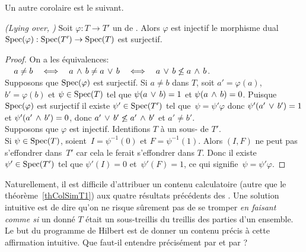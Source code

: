 Un autre corolaire est le suivant.
\begin{proposition}
\label{propRep2} \emph{(Lying over, \trdis)}
\Tcgi Soit $\varphi:T\rightarrow T'$ un \homo de \trdis. Alors $\varphi$
est injectif \ssi le morphisme dual ${\rm Spec}(\varphi):{\rm Spec}(T')\rightarrow {\rm Spec}(T)$ est
surjectif.
\end{proposition}
\begin{proof}
On a les équivalences:
$\quad  a\not= b\quad \Longleftrightarrow\quad  a\,\wedge\, b\not= a\,\vee\, b\quad
\Longleftrightarrow\quad
a\,\vee\, b\not\leq a\,\wedge\, b
$.
\\
Supposons que ${\rm Spec}(\varphi)$ est surjectif. Si $a\not= b$ dans $T$, soit
$a'=\varphi(a)$, $b'=\varphi(b)$ et
  $\psi\in{\rm Spec}(T)$ tel que $\psi(a\,\vee\, b)=1$ et
 $\psi(a\,\wedge\, b)=0$. Puisque  ${\rm Spec}(\varphi)$ est surjectif il existe
$\psi'\in{\rm Spec}(T')$ tel \hbox{que $\psi=\psi'\varphi$} donc  $\psi'(a'\,\vee\, b')=1$ 
et
 $\psi'(a'\,\wedge\, b')=0$, donc $a'\,\vee\, b'\not\leq a'\,\wedge\, b'$ et $ a'\not= b'$.\\
Supposons que  $\varphi$ est injectif. Identifions $T$ à un sous-\trdi 
de $T'$. \\
Si $\psi\in{\rm Spec}(T)$, \hbox{soient $I=\psi^{-1}(0)$} et $F=\psi^{-1}(1)$.
Alors $(I,F)$ ne peut pas s'effondrer dans~$T'$ car cela le ferait s'effondrer
dans $T$. Donc il existe $\psi'\in{\rm Spec}(T')$ tel que $\psi'(I)= 0$ 
\hbox{et $\psi'(F)= 1$}, ce qui signifie~\hbox{$\psi=\psi'\varphi$}.
\end{proof}

Naturellement, il est difficile d'attribuer un contenu calculatoire
(autre que le théorème~\ref{thColSimT1}) aux quatre résultats
précédents des \clama.
Une solution intuitive est de dire qu'on ne risque s\^urement pas de se
tromper {\em en faisant comme si} un \trdi donné $T$ était un sous-treillis du treillis des parties d'un ensemble.
Le but du programme de Hilbert est de donner un contenu précis à
cette affirmation intuitive.
Que faut-il entendre précisément par
 et
par ?





